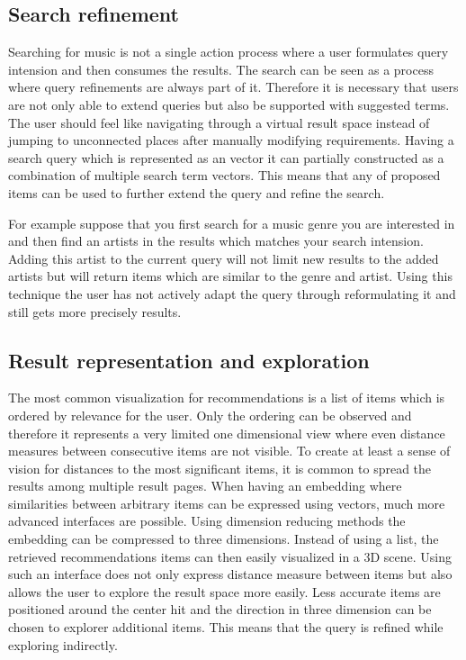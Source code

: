 \documentclass[a4paper]{llncs}
\begin{document}
	
	\subsection{Search refinement}
	
	Searching for music is not a single action process where a user formulates query intension and then consumes the results. The search can be seen as a process where query refinements are always part of it. Therefore it is necessary that users are not only able to extend queries but also be supported with suggested terms. The user should feel like navigating through a virtual result space instead of jumping to unconnected places after manually modifying requirements. Having a search query which is represented as an vector it can partially constructed as a combination of multiple search term vectors. This means that any of proposed items can be used to further extend the query and refine the search.
	
	For example suppose that you first search for a music genre you are interested in and then find an artists in the results which matches your search intension. Adding this artist to the current query will not limit new results to the added artists but will return items which are similar to the genre and artist. Using this technique the user has not actively adapt the query through reformulating it and still gets more precisely results. \\
	
	\subsection{Result representation and exploration}
	
	The most common visualization for recommendations is a list of items which is ordered by relevance for the user. Only the ordering can be observed and therefore it represents a very limited one dimensional view where even distance measures between consecutive items are not visible. To create at least a sense of vision for distances to the most significant items, it is common to spread the results among multiple result pages. 
	When having an embedding where similarities between arbitrary items can be expressed using vectors, much more advanced interfaces are possible. Using dimension reducing methods the embedding can be compressed to three dimensions. Instead of using a list, the retrieved recommendations items can then easily visualized in a 3D scene. Using such an interface does not only express distance measure between items but also allows the user to explore the result space more easily. Less accurate items are positioned around the center hit and the direction in three dimension can be chosen to explorer additional items. This means that the query is refined while exploring indirectly.
	
\end{document}
